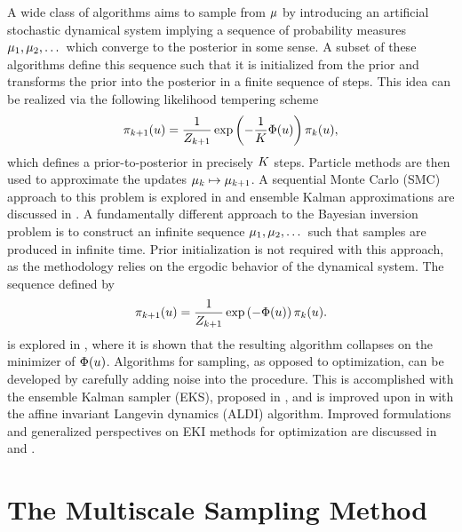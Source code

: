 \documentclass[12pt]{article}
\begin{document}
A wide class of algorithms aims to sample from $\mu$ by introducing an artificial stochastic dynamical system 
implying a sequence of probability measures $\mu_1, \mu_2, \dots$ which converge to the posterior in 
some sense. A subset of these algorithms define this sequence such that it is initialized from the prior and transforms the 
prior into the posterior in a finite sequence of steps. This idea can be realized via the following likelihood tempering 
scheme 
\begin{align*}
\pi_{k+1}(u) = \frac{1}{Z_{k+1}} \exp\left(-\frac{1}{K} \Phi(u) \right) \pi_{k}(u),
\end{align*}
which defines a prior-to-posterior in precisely $K$ steps. Particle methods are then used to approximate the updates
$\mu_k \mapsto \mu_{k+1}$. A sequential Monte Carlo (SMC) approach to this problem is explored in \cite{Kantas} 
and ensemble Kalman approximations are discussed in \cite{Iglesias}. A fundamentally different approach to the Bayesian inversion problem is to 
construct an infinite sequence $\mu_1, \mu_2, \dots$ such that samples are produced in infinite time. Prior initialization is not required 
with this approach, as the methodology relies on the ergodic behavior of the dynamical system. The sequence defined by 
\begin{align}
\pi_{k+1}(u) = \frac{1}{Z_{k+1}} \exp\left(-\Phi(u) \right) \pi_{k}(u). 
\end{align}
is explored in \cite{Huang}, where it is shown that the resulting algorithm collapses on the minimizer of $\Phi(u)$. Algorithms for sampling, as opposed
to optimization, can be developed by carefully adding noise into the procedure. This is accomplished with the ensemble Kalman sampler (EKS), proposed in 
\cite{Garbuno}, and is improved upon in \cite{Garbuno2} with the affine invariant Langevin dynamics (ALDI) algorithm. Improved formulations and generalized 
perspectives on EKI methods for optimization are discussed in \cite{Huang} and \cite{Chada}. 

\section{The Multiscale Sampling Method}
\end{document}
